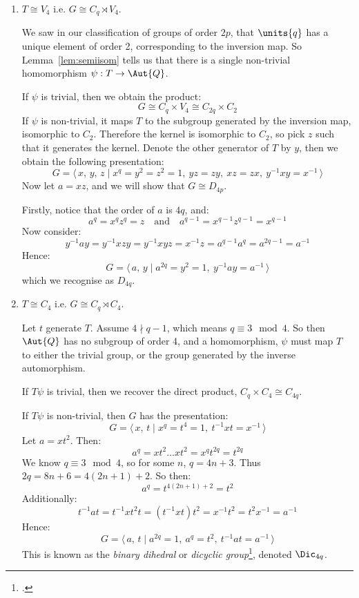 \begin{enumerate}
    \item \(T \cong V_4\) i.e. \(G \cong C_q \rtimes V_4\).

    We saw in our classification of groups of order \(2p\), that \(\units{q}\) has a unique element of order 2,
    corresponding to the inversion map.
    So Lemma~\ref{lem:semiisom} tells us that there is a single non-trivial homomorphism \(\psi:T \to \Aut{Q}\).

    If \(\psi\) is trivial, then we obtain the product:
    \[G \cong C_q \times V_4 \cong C_{2q} \times C_2\]
    If \(\psi\) is non-trivial, it maps \(T\) to the subgroup generated by the inversion map, isomorphic to \(C_2\).
    Therefore the kernel is isomorphic to \(C_2\), so pick \(z\) such that it generates the kernel.
    Denote the other generator of \(T\) by \(y\), then we obtain the following presentation:
    \[G = \langle\, x,\,y,\,z \mid x^q = y^2 = z^2 = 1,\ yz = zy,\ xz = zx,\ y^{-1}xy = x^{-1}\,\rangle\]
    Now let \(a = xz\), and we will show that \(G \cong D_{4p}\).

    Firstly, notice that the order of \(a\) is \(4q\), and:
    \[a^q = x^q z^q = z \quad \text{and} \quad a^{q-1} = x^{q-1} z^{q-1} = x^{q-1}\]
    Now consider:
    \[y^{-1}ay = y^{-1}xzy = y^{-1}xyz = x^{-1}z = a^{q-1} a^q = a^{2q-1} = a^{-1}\]
    Hence:
    \[G = \langle\, a,\,y \mid a^{2q} = y^2 = 1,\ y^{-1}ay = a^{-1}\,\rangle\]
    which we recognise as \(D_{4q}\).

    \item \(T \cong C_4\) i.e. \(G \cong C_q \rtimes C_4\).

        Let \(t\) generate \(T\).
        Assume \(4 \nmid q-1\), which means \(q \equiv 3 \mod{4}\).
        So then \(\Aut{Q}\) has no subgroup of order 4, and a homomorphism, \(\psi\) must map \(T\) to either the
        trivial group, or the group generated by the inverse automorphism.

        If \(T\psi\) is trivial, then we recover the direct product, \(C_q \times C_4 \cong C_{4q}\).

        If \(T\psi\) is non-trivial, then \(G\) has the presentation:
        \[G = \langle\, x,\,t \mid x^q = t^4 = 1,\ t^{-1}xt = x^{-1}\,\rangle\]
        Let \(a = xt^2\).
        Then:
        \[a^q = xt^2\dots xt^2 = x^q t^{2q} = t^{2q}\]
        We know \(q \equiv 3 \mod{4}\), so for some \(n\), \(q = 4n + 3\).
        Thus \(2q = 8n + 6 = 4(2n + 1) + 2\).
        So then:
        \[a^q = t^{4(2n + 1) + 2} = t^2\]
        Additionally:
        \[t^{-1}at = t^{-1}xt^2t = (t^{-1}xt)t^2 = x^{-1}t^2 = t^2 x^{-1} = a^{-1}\]
        Hence:
        \[G = \langle\, a,\,t \mid a^{2q} = 1,\ a^q = t^2,\ t^{-1}at = a^{-1}\,\rangle\]
        This is known as the \emph{binary dihedral} or \emph{dicyclic group}\footcite{dicyclic}, denoted \(\Dic_{4q}\).


\end{enumerate}
